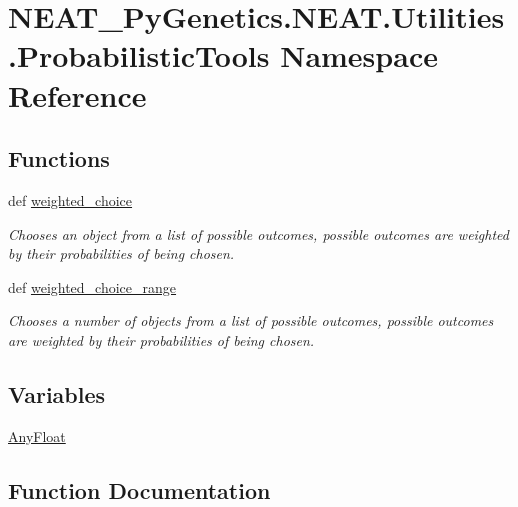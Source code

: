 \hypertarget{namespaceNEAT__PyGenetics_1_1NEAT_1_1Utilities_1_1ProbabilisticTools}{}\section{N\+E\+A\+T\+\_\+\+Py\+Genetics.\+N\+E\+A\+T.\+Utilities.\+Probabilistic\+Tools Namespace Reference}
\label{namespaceNEAT__PyGenetics_1_1NEAT_1_1Utilities_1_1ProbabilisticTools}
\subsection*{Functions}
\begin{DoxyCompactItemize}
\item 
def \hyperlink{namespaceNEAT__PyGenetics_1_1NEAT_1_1Utilities_1_1ProbabilisticTools_a221f1f7b971343a6b94683e937f85161}{weighted\+\_\+choice}
\begin{DoxyCompactList}\small\item\em Chooses an object from a list of possible outcomes, possible outcomes are weighted by their probabilities of being chosen. \end{DoxyCompactList}\item 
def \hyperlink{namespaceNEAT__PyGenetics_1_1NEAT_1_1Utilities_1_1ProbabilisticTools_a43b159877aba0fde144f159772e135f6}{weighted\+\_\+choice\+\_\+range}
\begin{DoxyCompactList}\small\item\em Chooses a number of objects from a list of possible outcomes, possible outcomes are weighted by their probabilities of being chosen. \end{DoxyCompactList}\end{DoxyCompactItemize}
\subsection*{Variables}
\begin{DoxyCompactItemize}
\item 
\hyperlink{namespaceNEAT__PyGenetics_1_1NEAT_1_1Utilities_1_1ProbabilisticTools_a77fe590d9378f14206a59d8e6bdec281}{Any\+Float}
\end{DoxyCompactItemize}


\subsection{Function Documentation}
